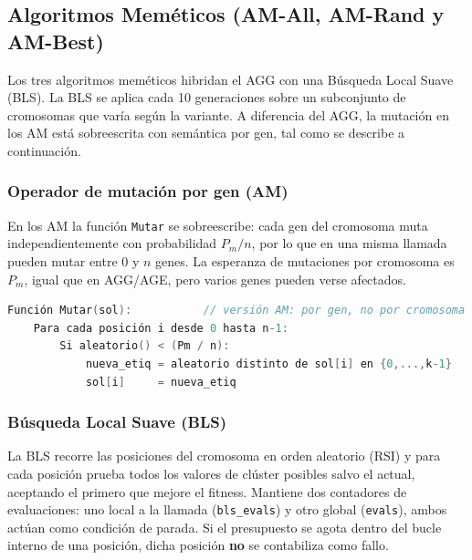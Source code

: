 \documentclass[12pt]{article}
\begin{document}
\subsection{Algoritmos Meméticos (AM-All, AM-Rand y AM-Best)}
 
Los tres algoritmos meméticos hibridan el AGG con una Búsqueda Local Suave (BLS).
La BLS se aplica cada 10 generaciones sobre un subconjunto de cromosomas que varía
según la variante. A diferencia del AGG, la mutación en los AM está
{sobreescrita} con semántica por gen, tal como se describe a continuación.
 
\subsubsection{Operador de mutación por gen (AM)}
 
En los AM la función \texttt{Mutar} se sobreescribe: cada gen del cromosoma muta
{independientemente} con probabilidad $P_m / n$, por lo que en una misma
llamada pueden mutar entre 0 y $n$ genes. La esperanza de mutaciones por cromosoma
es $P_m$, igual que en AGG/AGE, pero varios genes pueden verse afectados.
 
\begin{lstlisting}[language=C++, mathescape=true,
    caption={Operador de mutación por gen (AM, sobreescribe la versión AGG/AGE)},
    label={lst:mutate_am}]
Función Mutar(sol):           // versión AM: por gen, no por cromosoma
    Para cada posición i desde 0 hasta n-1:
        Si aleatorio() < (Pm / n):
            nueva_etiq = aleatorio distinto de sol[i] en {0,...,k-1}
            sol[i]     = nueva_etiq
\end{lstlisting}
 
\subsubsection*{Búsqueda Local Suave (BLS)}
 
La BLS recorre las posiciones del cromosoma en orden aleatorio (RSI) y para cada
posición prueba todos los valores de clúster posibles salvo el actual, aceptando
el primero que mejore el fitness. Mantiene dos contadores de evaluaciones: uno local
a la llamada (\texttt{bls\_evals}) y otro global (\texttt{evals}), ambos actúan
como condición de parada. Si el presupuesto se agota dentro del bucle interno de
una posición, dicha posición \textbf{no} se contabiliza como fallo.
 
\end{document}

